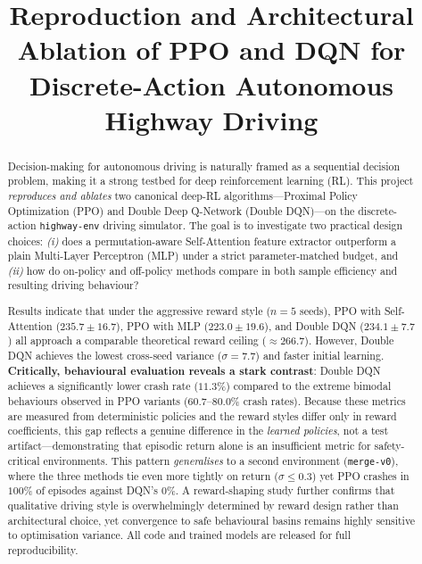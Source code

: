 \documentclass[conference]{IEEEtran}
\newcommand{\code}[1]{\texttt{#1}}
\begin{document}
\title{Reproduction and Architectural Ablation of PPO and DQN for
Discrete-Action Autonomous Highway Driving}

\author{
}

\maketitle

\begin{abstract}
Decision-making for autonomous driving is naturally framed as a sequential
decision problem, making it a strong testbed for deep reinforcement learning
(RL). This project \emph{reproduces and ablates} two canonical deep-RL
algorithms---Proximal Policy Optimization (PPO) and Double Deep Q-Network
(Double DQN)---on the discrete-action \code{highway-env} driving simulator. The
goal is to investigate two practical design choices: \emph{(i)} does a
permutation-aware Self-Attention feature extractor outperform a plain
Multi-Layer Perceptron (MLP) under a strict parameter-matched budget, and
\emph{(ii)} how do on-policy and off-policy methods compare in both sample
efficiency and resulting driving behaviour?

Results indicate that under the aggressive reward style ($n=5$ seeds), PPO with
Self-Attention ($235.7 \pm 16.7$), PPO with MLP ($223.0 \pm 19.6$), and Double
DQN ($234.1 \pm 7.7$) all approach a comparable theoretical reward ceiling
(${\approx}266.7$). However, Double DQN achieves the lowest cross-seed variance
($\sigma=7.7$) and faster initial learning. \textbf{Critically, behavioural
evaluation reveals a stark contrast}: Double DQN achieves a significantly lower
crash rate ($11.3\%$) compared to the extreme bimodal behaviours observed in PPO
variants ($60.7$--$80.0\%$ crash rates). Because these metrics are measured from
deterministic policies and the reward styles differ only in reward coefficients,
this gap reflects a genuine difference in the \emph{learned policies}, not a
test artifact---demonstrating that episodic return alone is an insufficient
metric for safety-critical environments. This pattern \emph{generalises} to a
second environment (\code{merge-v0}), where the three methods tie even more
tightly on return ($\sigma\leq0.3$) yet PPO crashes in $100\%$ of episodes
against DQN's $0\%$. A
reward-shaping study further confirms that qualitative driving style is
overwhelmingly determined by reward design rather than architectural choice, yet
convergence to safe behavioural basins remains highly sensitive to optimisation
variance. All code and trained models are released for full reproducibility.
\end{abstract}
\end{document}
